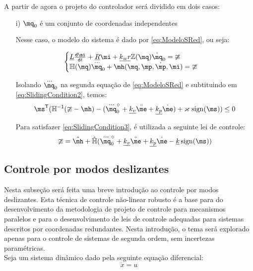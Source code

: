 \documentclass[a4paper,11pt,brazil,fleqn]{article}
\begin{document}
A partir de agora o projeto do controlador ser\'a dividido em dois casos:

\begin{itemize}
\item[i)] $\mq_0$ \'e um conjunto de coordenadas independentes

Nesse caso, o modelo do sistema \'e dado por \eqref{eq:ModeloSRed}, ou seja:

$$
\begin{cases}
\underline{L} \frac{\dd \mi}{\dd t} + \underline{R} \mi + \underline{k_w r} \mZ (\mq) \dot{\mq}_0= \mup
\\
\mH(\mq) \dddot{\mq}_0 + \mh(\mq,\mp,\dot{\mp}, \mi) = \mup
\end{cases}
$$

Isolando $\dddot{\mq}_0$ na segunda equa\c{c}\~ao de \eqref{eq:ModeloSRed} e subtituindo em \eqref{eq:SlidingCondition2}, temos:
\begin{equation} \label{eq:SlidingCondition3}
\ms^\msT (\mH^\msI (\mup - \mh ) -(\dddot{\mq}_0^\sdia + \underline{k_v}\ddot{\me} + \underline{k_p}\dot{\me}) + \varkappa \, \sign(\ms) ) \leq 0
\end{equation}

Para satisfazer \eqref{eq:SlidingCondition3}, \'e utilizada a seguinte lei de controle:
\begin{equation}
\mup = \hat{\mh} + \hat{\mH}( \dddot{\mq}_0^\sdia + \underline{k_v}\ddot{\me} + \underline{k_p}\dot{\me} - \underline{k} \sign(\ms) )
\end{equation}

\end{itemize}

\subsection{Controle por modos deslizantes}\label{S04-7}

Nesta subse\c{c}\~ao ser\'a feita uma breve introdu\c{c}\~ao ao controle por modos deslizantes. Esta t\'ecnica de controle n\~ao-linear robusto \'e a base para do desenvolvimento da metodologia de projeto de controle para mecanismos paralelos e para o desenvolvimento de leis de controle adequadas para sistemas descritos por coordenadas redundantes. Nesta introdu\c{c}\~ao, o tema ser\'a explorado apenas para o controle de sistemas de segunda ordem, sem incertezas param\'etricas. \\

Seja um sistema din\^amico dado pela seguinte equa\c{c}\~ao diferencial:
\begin{equation} \label{eq:SimpleODE}
\ddot{x} = u
\end{equation}
\end{document}
